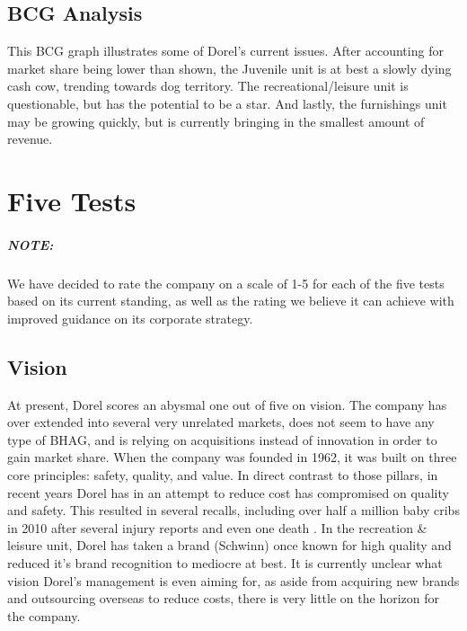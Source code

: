 {\section{BCG Analysis}
This BCG graph illustrates some of Dorel's current issues.  After accounting for market share being lower than shown, the Juvenile unit is at best a slowly dying cash cow, trending towards dog territory.  The recreational/leisure unit is questionable, but has the potential to be a star.  And lastly, the furnishings unit may be growing quickly, but is currently bringing in the smallest amount of revenue.

\chapter{Five Tests}
\label{chp:tests}
\paragraph{NOTE:}We have decided to rate the company on a scale of 1-5 for each of the five tests based on its current standing, as well as the rating we believe it can achieve with improved guidance on its corporate strategy.



\section{Vision}
At present, Dorel scores an abysmal one out of five on vision.  The company has over extended into several very unrelated markets, does not seem to have any type of BHAG, and is relying on acquisitions instead of innovation in order to gain market share.  When the company was founded in 1962, it was built on three core principles: safety, quality, and value.  In direct contrast to those pillars, in recent years Dorel has in an attempt to reduce cost has compromised on quality and safety. This resulted in several recalls, including over half a million baby cribs in 2010 after several injury reports and even one death \cite{Commission2010}.  In the recreation \& leisure unit, Dorel has taken a brand (Schwinn) once known for high quality and reduced it’s brand recognition to mediocre at best.  It is currently unclear what vision Dorel’s management is even aiming for, as aside from acquiring new brands and outsourcing overseas to reduce costs, there is very little on the horizon for the company.  

}
